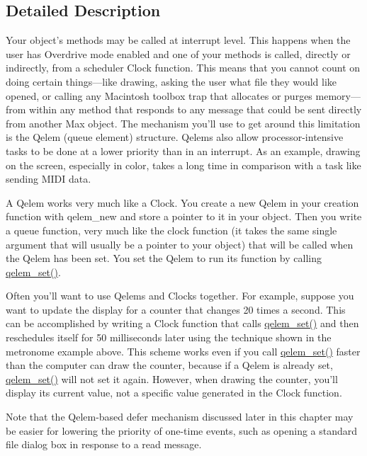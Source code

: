 \subsection{Detailed Description}
Your object’s methods may be called at interrupt level. This happens when the user has Overdrive mode enabled and one of your methods is called, directly or indirectly, from a scheduler Clock function. This means that you cannot count on doing certain things—like drawing, asking the user what file they would like opened, or calling any Macintosh toolbox trap that allocates or purges memory—from within any method that responds to any message that could be sent directly from another Max object. The mechanism you’ll use to get around this limitation is the Qelem (queue element) structure. Qelems also allow processor-\/intensive tasks to be done at a lower priority than in an interrupt. As an example, drawing on the screen, especially in color, takes a long time in comparison with a task like sending MIDI data.

A Qelem works very much like a Clock. You create a new Qelem in your creation function with qelem\_\-new and store a pointer to it in your object. Then you write a queue function, very much like the clock function (it takes the same single argument that will usually be a pointer to your object) that will be called when the Qelem has been set. You set the Qelem to run its function by calling \hyperlink{group__qelems_ga3e292aad133af89a87e167e88cc4a1b5}{qelem\_\-set()}.

Often you’ll want to use Qelems and Clocks together. For example, suppose you want to update the display for a counter that changes 20 times a second. This can be accomplished by writing a Clock function that calls \hyperlink{group__qelems_ga3e292aad133af89a87e167e88cc4a1b5}{qelem\_\-set()} and then reschedules itself for 50 milliseconds later using the technique shown in the metronome example above. This scheme works even if you call \hyperlink{group__qelems_ga3e292aad133af89a87e167e88cc4a1b5}{qelem\_\-set()} faster than the computer can draw the counter, because if a Qelem is already set, \hyperlink{group__qelems_ga3e292aad133af89a87e167e88cc4a1b5}{qelem\_\-set()} will not set it again. However, when drawing the counter, you’ll display its current value, not a specific value generated in the Clock function.

Note that the Qelem-\/based defer mechanism discussed later in this chapter may be easier for lowering the priority of one-\/time events, such as opening a standard file dialog box in response to a read message.

